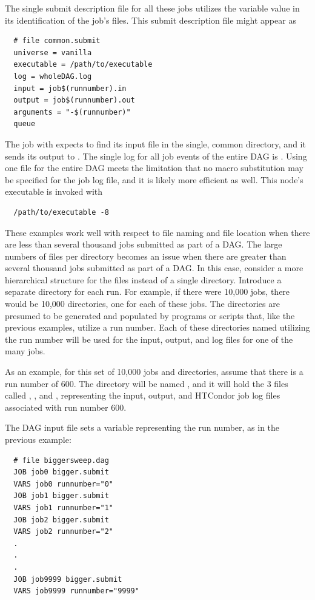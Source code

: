 \begin{description}
The single submit description file for all these jobs utilizes the
 variable value in its identification of the job's
files. 
This submit description file might appear as
\begin{verbatim}
  # file common.submit
  universe = vanilla
  executable = /path/to/executable
  log = wholeDAG.log
  input = job$(runnumber).in
  output = job$(runnumber).out
  arguments = "-$(runnumber)"
  queue
\end{verbatim}
The job with  expects to find its input file  
in the single, common directory, 
and it sends its output to .
The single log for all job events of the entire DAG is .
Using one file for the entire DAG meets the limitation that no macro
substitution may be specified for the job log file, 
and it is likely more efficient as well. 
This node's executable is invoked with
\begin{verbatim}
  /path/to/executable -8
\end{verbatim}

\end{description}

These examples work well with respect to file naming and file location
when there are less than several thousand jobs submitted as part
of a DAG.
The large numbers of files per directory becomes an issue when there
are greater than several thousand jobs submitted as part of a DAG.
In this case,
consider a more hierarchical structure for the files instead of a single
directory.
Introduce a separate directory for each run.
For example, if there were 10,000 jobs, there would be
10,000 directories, one for each of these jobs.
The directories are presumed to be generated and populated by 
programs or scripts that,
like the previous examples, utilize a run number.
Each of these directories named utilizing the run number will be used
for the input, output, and log files for one of the many jobs.

As an example, for this set of 10,000 jobs and directories, assume
that there is a run number of 600.
The directory will be named , and it will
hold the 3 files called , , and ,
representing the input, output, and HTCondor job log files associated
with run number 600.

The DAG input file sets a variable representing the run number,
as in the previous example:
\begin{verbatim}
  # file biggersweep.dag
  JOB job0 bigger.submit
  VARS job0 runnumber="0"
  JOB job1 bigger.submit
  VARS job1 runnumber="1"
  JOB job2 bigger.submit
  VARS job2 runnumber="2"
  .
  .
  .
  JOB job9999 bigger.submit
  VARS job9999 runnumber="9999"
\end{verbatim}

